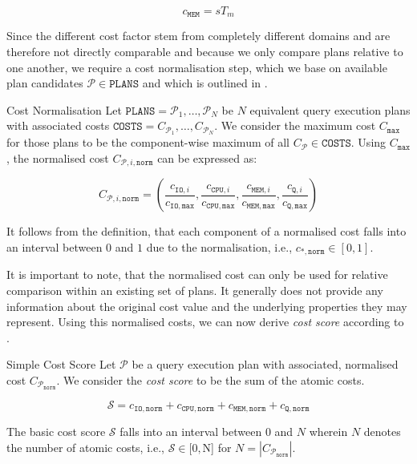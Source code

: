 \begin{equation*}
    c_{\mathtt{MEM}} = sT_m
\end{equation*}

Since the different cost factor stem from completely different domains and are therefore not directly comparable and because we only compare plans relative to one another, we require a cost normalisation step, which we base on available plan candidates $\mathcal{P} \in \mathtt{PLANS}$ and which is outlined in .

\begin{definition}[label=definition:cost_normalisation]{Cost Normalisation}{}
    Let $\mathtt{PLANS} = \mathcal{P}_1, \ldots, \mathcal{P}_N$ be $N$ equivalent query execution plans with associated costs $\mathtt{COSTS} =C_{\mathcal{P}_1}, \ldots,C_{\mathcal{P}_N}$. We consider the maximum cost $C_{\mathtt{max}}$ for those plans to be the component-wise maximum of all $C_{\mathcal{P}} \in \mathtt{COSTS}$. Using $C_{\mathtt{max}}$, the normalised cost $ C_{\mathcal{P},i,\mathtt{norm}}$ can be expressed as:

    \begin{equation*}
        C_{\mathcal{P},i,\mathtt{norm}} = (\frac{c_{\mathtt{IO},i}}{c_{\mathtt{IO},\mathtt{max}}},\frac{c_{\mathtt{CPU},i}}{c_{\mathtt{CPU},\mathtt{max}}},\frac{c_{\mathtt{MEM},i}}{c_{\mathtt{MEM},\mathtt{max}}},\frac{c_{\mathtt{Q},i}}{c_{\mathtt{Q},\mathtt{max}}})
    \end{equation*}

    It follows from the definition, that each component of a normalised cost falls into an interval between $0$ and $1$ due to the normalisation, i.e., $c_{\mathtt{*},\mathtt{norm}} \in [ 0, 1 ]$.
\end{definition}

It is important to note, that the normalised cost can only be used for relative comparison within an existing set of plans. It generally does not provide any information about the original cost value and the underlying properties they may represent. Using this normalised costs, we can now derive \emph{cost score} according to .

\begin{definition}[label=definition:cost_score]{Simple Cost Score}{}
    Let $\mathcal{P}$  be a query execution plan with associated, normalised cost $C_{\mathcal{P}_{\mathtt{norm}}}$. We consider the \emph{cost score} to be the sum of the atomic costs.

    \begin{equation*}
        \mathcal{S} = c_{\mathtt{IO},\mathtt{norm}} + c_{\mathtt{CPU},\mathtt{norm}} + c_{\mathtt{MEM},\mathtt{norm}} + c_{\mathtt{Q},\mathtt{norm}}
    \end{equation*}

    The basic cost score $ \mathcal{S}$ falls into an interval between $0$ and $N$ wherein $N$ denotes the number of atomic costs, i.e., $\mathcal{S} \in [0, $N] for $N = |C_{\mathcal{P}_{\mathtt{norm}}}|$.
\end{definition}

